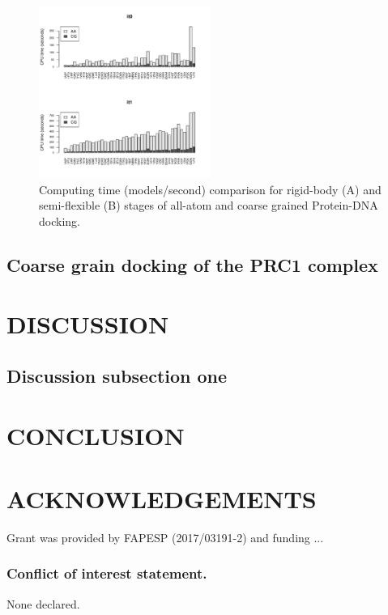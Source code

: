 \documentclass[a4,center,fleqn]{NAR}
\begin{document}
\begin{figure}[t]
\begin{center}
\includegraphics[width=0.5\textwidth]{figures/cpu-time.pdf}
\end{center}
\caption{Computing time (models/second) comparison for rigid-body (A) and semi-flexible (B) stages of all-atom and coarse grained Protein-DNA docking.}
\label{cpu-time}
\end{figure}

\subsection{Coarse grain docking of the PRC1 complex}

\section{DISCUSSION}

\subsection{Discussion subsection one}

\section{CONCLUSION}


\section{ACKNOWLEDGEMENTS}

Grant was provided by FAPESP (2017/03191-2) and funding ...


\subsubsection{Conflict of interest statement.} None declared.
\newpage
\end{document}
